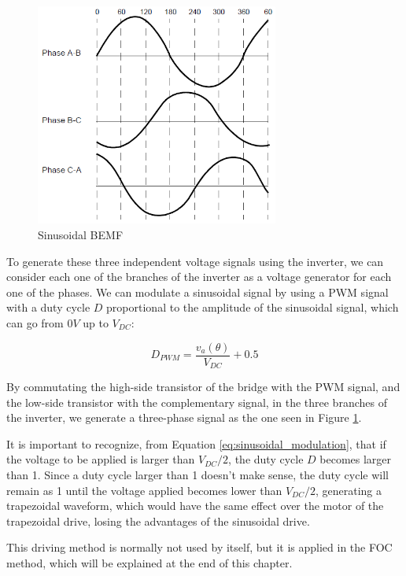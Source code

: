 \begin{figure}[htbp]
\centering
\includegraphics[width=8cm]{Images/sinusoidal_BEMF.png} 
\caption[Sinusoidal BEMF]{Sinusoidal BEMF}
\label{fig:sinusoidal_bemf}
\end{figure}

To generate these three independent voltage signals using the inverter, we can consider each one of the branches of the inverter as a voltage generator for each one of the phases. We can modulate a sinusoidal signal by using a \ac{PWM} signal with a duty cycle $D$ proportional to the amplitude of the sinusoidal signal, which can go from $0V$ up to $V_{DC}$:

\begin{equation} \label{eq:sinusoidal_modulation}
	D_{PWM} = \frac{v_{a}(\theta)}{V_{DC}} + 0.5
\end{equation}

By commutating the high-side transistor of the bridge with the \ac{PWM} signal, and the low-side transistor with the complementary signal, in the three branches of the inverter, we generate a three-phase signal as the one seen in Figure \ref{fig:sinusoidal_bemf}.

It is important to recognize, from Equation \ref{eq:sinusoidal_modulation}, that if the voltage to be applied is larger than $V_{DC}/2$, the duty cycle $D$ becomes larger than 1. Since a duty cycle larger than 1 doesn't make sense, the duty cycle will remain as 1 until the voltage applied becomes lower than $V_{DC}/2$, generating a trapezoidal waveform, which would have the same effect over the motor of the trapezoidal drive, losing the advantages of the sinusoidal drive.

This driving method is normally not used by itself, but it is applied in the \acf{FOC} method, which will be explained at the end of this chapter.

